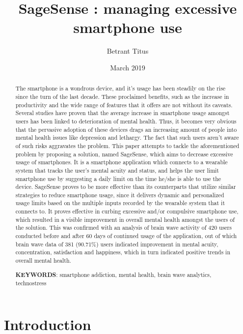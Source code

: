 \documentclass{article}
\title{SageSense : managing excessive smartphone use}
\author{Betrant Titus}
\date{March 2019}
\begin{document}
\maketitle


\begin{abstract}
    The smartphone is a wondrous device, and it's usage has been steadily on the rise since the turn of the last decade. These proclaimed benefits, such as the increase in productivity and the wide range of features that it offers are not without its caveats. Several studies have proven that the average increase in smartphone usage amongst users has been linked to deterioration of mental health\cite{bian2015linking,twenge2017have,ward2017brain}. Thus, it becomes very obvious that the pervasive adoption of these devices drags an increasing amount of people into mental health issues like depression and lethargy. The fact that such users aren't aware of such risks aggravates the problem. This paper attempts to tackle the aforementioned problem by proposing a solution, named SageSense, which aims to decrease excessive usage of smartphones. It is a smartphone application which connects to a wearable system that tracks the user's mental acuity and status, and helps the user limit smartphone use by suggesting a daily limit on the time he/she is able to use the device. SageSense proves to be more effective than its counterparts that utilize similar strategies to reduce smartphone usage, since it delivers dynamic and personalized usage limits based on the multiple inputs recorded by the wearable system that it connects to. It proves effective in curbing excessive and/or compulsive smartphone use, which resulted in a visible improvement in overall mental health amongst the users of the solution. This was confirmed with an analysis of brain wave activity of 420 users conducted before and after 60 days of continued usage of the application, out of which brain wave data of 381 (90.71\%) users indicated improvement in mental acuity, concentration, satisfaction and happiness, which in turn indicated positive trends in overall mental health.
    
    \textbf{KEYWORDS}: smartphone addiction, mental health, brain wave analytics, technostress
\end{abstract}


\newpage


\section{Introduction}
\end{document}
